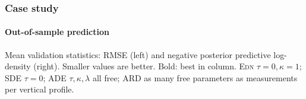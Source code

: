 \documentclass{snedecorbeamer}
\begin{document}
\begin{frame}%
  \label{frm:validation-statistics}
  \frametitle{Case study}
  \framesubtitle{Out-of-sample prediction}

  \begin{table}
    \caption{Mean validation statistics
      $\bar{v}^{(p, q)}$: RMSE (left) and negPPLD (right).
      Smaller values are better. Bold: best in class.}%
    \label{tab:validation-statistics-mini}
  \end{table}

  Mean validation statistics: RMSE (left) and negative posterior
  predictive log-density (right).  Smaller values are better. Bold: best
  in column. \textsc{Edn} $\tau = 0, \kappa = 1$; \textsc{SDE} $\tau =
  0$; \textsc{ADE} $\tau, \kappa, \lambda$ all free; \textsc{ARD} as
  many free parameters as measurements per vertical profile.
\end{frame}
\end{document}
